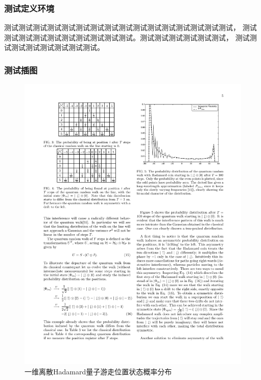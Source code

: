 \documentclass[10pt,serif,t]{beamer}
\begin{document}
\begin{frame}
  \frametitle{测试定义环境}
  \begin{definition}
    测试测试测试测试测试测试测试测试测试测试测试测试测试测试测试测试，
    测试测试测试测试测试测试测试测试测试测试。测试测试测试测试测试测试，
    测试测试测试测试测试测试测试测试。
  \end{definition}
\end{frame}

\begin{frame}
  \frametitle{测试插图}  
  \begin{figure}
    \centering
    \includegraphics[height=0.6\textheight]{1d_hadamard_quantum_walk.pdf}
    \caption{一维离散Hadamard量子游走位置状态概率分布}
  \end{figure}
\end{frame}
\end{document}

